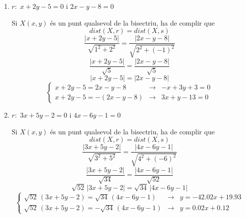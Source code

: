 \documentclass{book}
\begin{document}
\begin{mylist}
	\begin{enumerate}
		\item $r:$ $x+2y-5=0$ i $2x-y-8=0$
		\begin{bluebox}
			\begin{center}
				Si $X(x,y)$ és un punt qualsevol de la bisectriu, ha de complir que 
				\[ dist(X,r) = dist(X,s) \]
				\[ \dfrac{|x+2y-5|}{\sqrt{1^2+2^2}}= \dfrac{|2x-y-8|}{\sqrt{2^2+(-1)^2}} \]
				\[ \dfrac{|x+2y-5|}{\sqrt{5}}= \dfrac{|2x-y-8|}{\sqrt{5}} \]
				\[ |x+2y-5|= |2x-y-8| \]
				\[ \left\{\begin{array}{lcl} x+2y-5= 2x-y-8 & \rightarrow & -x+3y+3=0\\  x+2y-5=-(2x-y-8) & \rightarrow & 3x+y-13=0    \end{array}\right.  \]
				
			\end{center}
		\end{bluebox}
	
	\newpage
		\item $r:$ $3x+5y-2=0$ i $4x-6y-1=0$
		\begin{bluebox}
			\begin{center}
				Si $X(x,y)$ és un punt qualsevol de la bisectriu, ha de complir que 
				\[ dist(X,r) = dist(X,s) \]
				\[ \dfrac{|3x+5y-2|}{\sqrt{3^2+5^2}}= \dfrac{|4x-6y-1|}{\sqrt{4^2+(-6)^2}} \]
				\[ \dfrac{|3x+5y-2|}{\sqrt{34}}= \dfrac{|4x-6y-1|}{\sqrt{52}} \]
				\[ \sqrt{52} \,|3x+5y-2|= \sqrt{34}\, |4x-6y-1| \]
				\[ \left\{\begin{array}{lcl}\sqrt{52}\, (3x+5y-2)= \sqrt{34} \, (4x-6y-1) & \rightarrow &  y=-42.02x+19.93\\  \sqrt{52}\, (3x+5y-2)= -\sqrt{34}\, (4x-6y-1) & \rightarrow &  y=0.02x+0.12  \end{array}\right. \]
				

\end{center}
\end{bluebox}
\end{enumerate}
\end{mylist}
\end{document}
